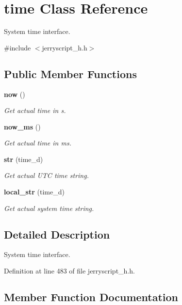 \section{time Class Reference}
\label{classtime}


System time interface.  




{\ttfamily \#include $<$jerryscript\+\_\+h.\+h$>$}

\subsection*{Public Member Functions}
\begin{DoxyCompactItemize}
\item 
\textbf{ now} ()
\begin{DoxyCompactList}\small\item\em Get actual time in s. \end{DoxyCompactList}\item 
\textbf{ now\+\_\+ms} ()
\begin{DoxyCompactList}\small\item\em Get actual time in ms. \end{DoxyCompactList}\item 
\textbf{ str} (time\+\_\+d)
\begin{DoxyCompactList}\small\item\em Get actual U\+TC time string. \end{DoxyCompactList}\item 
\textbf{ local\+\_\+str} (time\+\_\+d)
\begin{DoxyCompactList}\small\item\em Get actual system time string. \end{DoxyCompactList}\end{DoxyCompactItemize}


\subsection{Detailed Description}
System time interface. 

Definition at line 483 of file jerryscript\+\_\+h.\+h.



\subsection{Member Function Documentation}
\mbox{\label{classtime_a849383e572aadbebabadf4db9ce39702}} 
